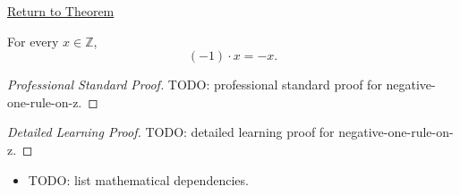 \newpage
{}
\label{prf:negative-one-rule-on-z}

\begin{remark*}[Return]
\hyperref[cor:negative-one-rule-on-z]{Return to Theorem}
\end{remark*}

\begin{corollary*}
For every $x\in\mathbb{Z}$,
\[
(-1)\cdot x=-x.
\]
\end{corollary*}

\begin{proof}[Professional Standard Proof]
\LRAProofBodyStart
TODO: professional standard proof for negative-one-rule-on-z.
\end{proof}

\begin{proof}[Detailed Learning Proof]
\LRAProofBodyStart
TODO: detailed learning proof for negative-one-rule-on-z.
\end{proof}

\begin{remark*}
\end{remark*}

\begin{dependencies}
\begin{itemize}
  \item TODO: list mathematical dependencies.
\end{itemize}
\end{dependencies}

\clearpage
